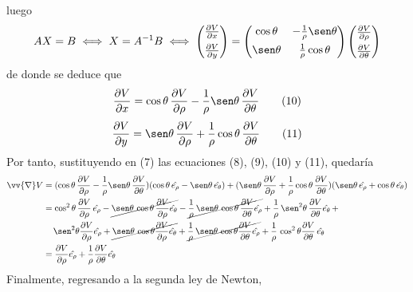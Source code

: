\documentclass[12pt]{report}
\begin{document}
luego
\[AX=B \iff X = A^{-1}B \iff 
\begin{pmatrix}
\frac{\partial V}{\partial x} \\[5pt]
\frac{\partial V}{\partial y}
\end{pmatrix}
=
\begin{pmatrix}
    \cos\theta & -\frac{1}{\rho}\sen\theta \\[5pt]
    \sen\theta & \frac{1}{\rho}\cos\theta
\end{pmatrix}
\begin{pmatrix}
\frac{\partial V}{\partial \rho} \\[5pt]
\frac{\partial V}{\partial \theta}
\end{pmatrix}
\]
de donde se deduce que
\[
\frac{\partial V}{\partial x}=\cos\theta \, \frac{\partial V}{\partial \rho}-\frac{1}{\rho}\sen\theta \, \frac{\partial V}{\partial \theta} \tag{10}
\]
\[
\frac{\partial V}{\partial y}=\sen\theta \, \frac{\partial V}{\partial \rho}+\frac{1}{\rho}\cos\theta \, \frac{\partial V}{\partial \theta} \tag{11}
\]
Por tanto, sustituyendo en (7) las ecuaciones (8), (9), (10) y (11), quedaría
\small
\[
\begin{aligned}[t]
\vv{\nabla}V &= (\cos\theta \, \frac{\partial V}{\partial \rho}-\frac{1}{\rho}\sen\theta \, \frac{\partial V}{\partial \theta})(\cos\theta \, \hat{e_\rho}-\sen\theta \, \hat{e_\theta}) + (\sen\theta \, \frac{\partial V}{\partial \rho}+\frac{1}{\rho}\cos\theta \, \frac{\partial V}{\partial \theta})(\sen\theta \, \hat{e_\rho}+\cos\theta \, \hat{e_\theta}) \\
&= \cos^2\theta \, \frac{\partial V}{\partial \rho} \, \hat{e_\rho} - \cancel{\sen\theta \, \cos\theta \, \frac{\partial V}{\partial \rho} \hat{e_\theta}} - \cancel{\frac{1}{\rho} \, \sen\theta \, \cos\theta \, \frac{\partial V}{\partial \theta} \hat{e_\rho}}+\frac{1}{\rho} \, \sen^2 \theta \, \frac{\partial V}{\partial \theta} \hat{e_\theta} \, + \\
& \ \ \ \, \sen^2\theta \frac{\partial V}{\partial \rho} \hat{e_\rho}+\cancel{\sen\theta \, \cos\theta \frac{\partial V}{\partial \rho} \hat{e_\theta}}+\cancel{\frac{1}{\rho} \, \sen\theta \, \cos\theta \frac{\partial V}{\partial \theta} \hat{e_\rho}} + \frac{1}{\rho} \, \cos^2\theta \frac{\partial V}{\partial \theta} \, \hat{e_\theta} \\
&= \frac{\partial V}{\partial \rho}\hat{e_\rho}+\frac{1}{\rho}\frac{\partial V}{\partial \theta}\hat{e_\theta}
\end{aligned}
\]
\normalsize
Finalmente, regresando a la segunda ley de Newton,
\end{document}
